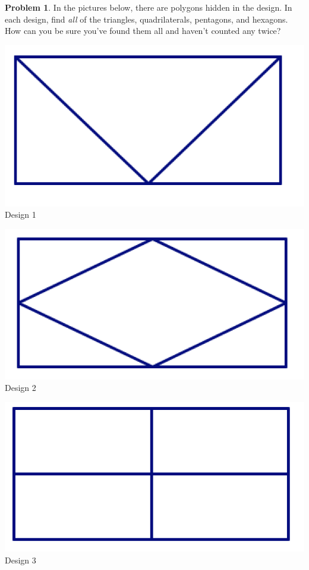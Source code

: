 \documentclass[12pt, reqno]{amsart}
\theoremstyle{remark}
\theoremstyle{definition}
\newtheorem{problem}{Problem}
\numberwithin{equation}{section}  %
\begin{document}
\bigskip


\newpage

\begin{problem}
In the pictures below, there are polygons hidden in the design.  In each design, find \emph{all} of the triangles, quadrilaterals, pentagons, and hexagons.  How can you be sure you've found them all and haven't counted any twice?

\end{problem}

\begin{center}
\includegraphics[scale=0.65]{design1} \\
Design 1

\bigskip
\includegraphics[scale=0.65]{design2} \\
Design 2

\bigskip

\includegraphics[scale=0.65]{design3} \\
Design 3


\end{center}
\end{document}

